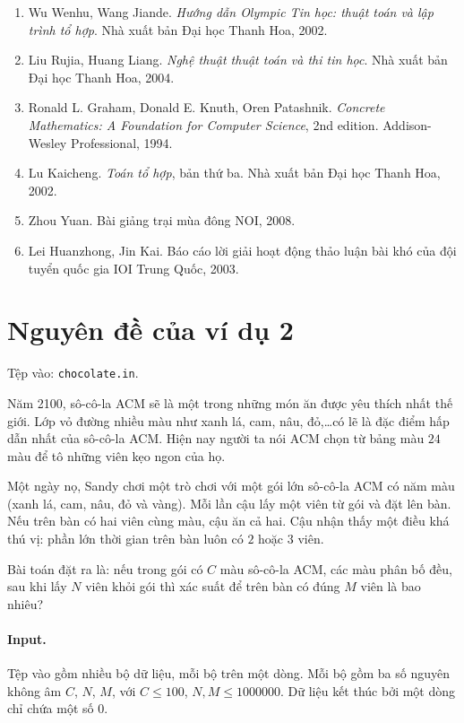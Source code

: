 \documentclass[11pt]{article}
\begin{document}
\begin{enumerate}
  \item Wu Wenhu, Wang Jiande. \textit{Hướng dẫn Olympic Tin học: thuật toán
  và lập trình tổ hợp}. Nhà xuất bản Đại học Thanh Hoa, 2002.
  \item Liu Rujia, Huang Liang. \textit{Nghệ thuật thuật toán và thi tin học}.
  Nhà xuất bản Đại học Thanh Hoa, 2004.
  \item Ronald L. Graham, Donald E. Knuth, Oren Patashnik. \textit{Concrete
  Mathematics: A Foundation for Computer Science}, 2nd edition.
  Addison-Wesley Professional, 1994.
  \item Lu Kaicheng. \textit{Toán tổ hợp}, bản thứ ba. Nhà xuất bản Đại học
  Thanh Hoa, 2002.
  \item Zhou Yuan. Bài giảng trại mùa đông NOI, 2008.
  \item Lei Huanzhong, Jin Kai. Báo cáo lời giải hoạt động thảo luận bài khó
  của đội tuyển quốc gia IOI Trung Quốc, 2003.
\end{enumerate}

\appendix
\section{Nguyên đề của ví dụ 2}

Tệp vào: \texttt{chocolate.in}.

Năm 2100, sô-cô-la ACM sẽ là một trong những món ăn được yêu thích nhất thế
giới. Lớp vỏ đường nhiều màu như xanh lá, cam, nâu, đỏ,\ldots có lẽ là đặc
điểm hấp dẫn nhất của sô-cô-la ACM. Hiện nay người ta nói ACM chọn từ bảng
màu \(24\) màu để tô những viên kẹo ngon của họ.

Một ngày nọ, Sandy chơi một trò chơi với một gói lớn sô-cô-la ACM có năm màu
(xanh lá, cam, nâu, đỏ và vàng). Mỗi lần cậu lấy một viên từ gói và đặt lên
bàn. Nếu trên bàn có hai viên cùng màu, cậu ăn cả hai. Cậu nhận thấy một điều
khá thú vị: phần lớn thời gian trên bàn luôn có \(2\) hoặc \(3\) viên.

Bài toán đặt ra là: nếu trong gói có \(C\) màu sô-cô-la ACM, các màu phân bố
đều, sau khi lấy \(N\) viên khỏi gói thì xác suất để trên bàn có đúng \(M\)
viên là bao nhiêu?

\paragraph{Input.}
Tệp vào gồm nhiều bộ dữ liệu, mỗi bộ trên một dòng. Mỗi bộ gồm ba số nguyên
không âm \(C\), \(N\), \(M\), với \(C\le 100\), \(N,M\le 1000000\). Dữ liệu
kết thúc bởi một dòng chỉ chứa một số \(0\).
\end{document}
